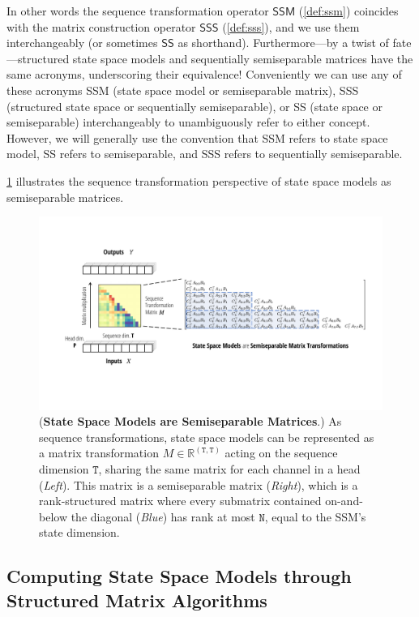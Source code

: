 In other words the sequence transformation operator $\mathsf{SSM}$ (\cref{def:ssm}) coincides with the matrix construction operator $\mathsf{SSS}$ (\cref{def:sss}),
and we use them interchangeably (or sometimes $\mathsf{SS}$ as shorthand).
Furthermore---by a twist of fate---structured state space models and sequentially semiseparable matrices have the same acronyms, underscoring their equivalence!
Conveniently we can use any of these acronyms SSM (state space model or semiseparable matrix), SSS (structured state space or sequentially semiseparable), or SS (state space or semiseparable) interchangeably to unambiguously refer to either concept.
However, we will generally use the convention that SSM refers to state space model, SS refers to semiseparable, and SSS refers to sequentially semiseparable.


\cref{fig:ssm-semiseparable} illustrates the sequence transformation perspective of state space models as semiseparable matrices.
\begin{figure}[!t]
  \centering
  \includegraphics[width=\linewidth]{fig/semiseparable.pdf}
  \caption{
    (\textbf{State Space Models are Semiseparable Matrices}.)
    As sequence transformations, state space models can be represented as a matrix transformation $M \in \mathbb{R}^{\mathtt{(T,T)}}$ acting on the sequence dimension $\mathtt{T}$,
    sharing the same matrix for each channel in a head (\emph{Left}).
    This matrix is a semiseparable matrix (\emph{Right}), which is a rank-structured matrix where every submatrix contained on-and-below the diagonal (\emph{Blue}) has rank at most $\mathtt{N}$,
    equal to the SSM's state dimension.
  }
  \label{fig:ssm-semiseparable}
\end{figure}


\subsection{Computing State Space Models through Structured Matrix Algorithms}
\label{sec:ssm:algorithms}

